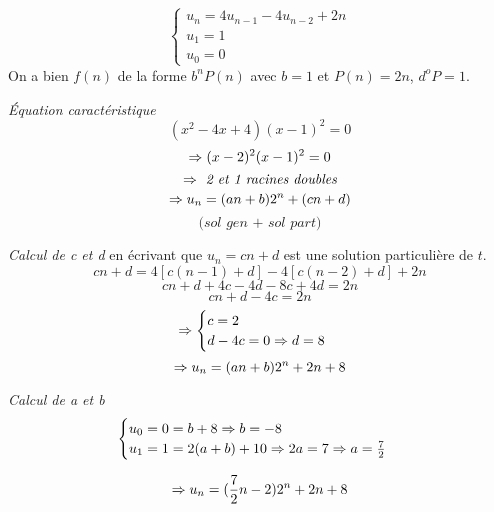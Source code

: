 \begin{exercice}
\[ \begin{cases} u_n = 4 u_{n-1} - 4 u_{n-2} + 2 n \\ u_1 = 1 \\ u_0 = 0 \end{cases} \]
On a bien $f(n)$ de la forme $b^n P(n)$ avec $b = 1$ et $P(n) = 2n$, $d^o P = 1$.

\textit{Équation caractéristique} 
\[ (x^2-4x+4)(x-1)^2 = 0 \]
\[ \Rightarrow (x-2)^2(x-1)^2 = 0 \]
\[ \Rightarrow \textit{ 2 et 1 racines doubles} \]
\[ \Rightarrow u_n=(an+b)2^n+(cn+d) \]
\[ \textit{(sol gen + sol part)} \]

\textit{Calcul de c et d} en écrivant que $u_n=cn+d$ est une solution particulière de $t$.
\[ cn+d=4[c(n-1)+d]-4[c(n-2)+d]+2n \] 
\[ cn+d+4c-4d-8c+4d=2n \]
\[ cn+d-4c=2n \]
\[ \Rightarrow \begin{cases} c=2 \\ d-4c=0 \Rightarrow d=8 \end{cases} \]
\[ \Rightarrow u_n=(an+b)2^n+2n+8 \]

\textit{Calcul de a et b}
\[ \begin{cases} u_0=0=b+8 \Rightarrow b=-8 \\u_1=1=2(a+b)+10 \Rightarrow 2a=7 \Rightarrow a=\frac{7}{2} \end{cases} \]

\[ \Rightarrow u_n=(\frac{7}{2}n-2)2^n+2n+8 \]

\end{exercice}

